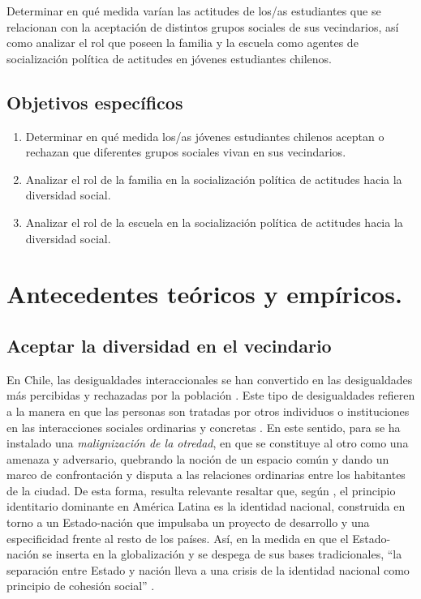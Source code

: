 \documentclass[12pt,twoside]{templates/facsothesis}
\begin{document}
Determinar en qué medida varían las actitudes de los/as estudiantes que se relacionan con la aceptación de distintos grupos sociales de sus vecindarios, así como analizar el rol que poseen la familia y la escuela como agentes de socialización política de actitudes en jóvenes estudiantes chilenos.

\hypertarget{objetivos-especuxedficos}{%
\section{Objetivos específicos}\label{objetivos-especuxedficos}}

\begin{enumerate}
\def\labelenumi{\arabic{enumi}.}
\item
  Determinar en qué medida los/as jóvenes estudiantes chilenos aceptan o rechazan que diferentes grupos sociales vivan en sus vecindarios.
\item
  Analizar el rol de la familia en la socialización política de actitudes hacia la diversidad social.
\item
  Analizar el rol de la escuela en la socialización política de actitudes hacia la diversidad social.
\end{enumerate}

\hypertarget{antecedentes-teuxf3ricos-y-empuxedricos.}{%
\chapter{Antecedentes teóricos y empíricos.}\label{antecedentes-teuxf3ricos-y-empuxedricos.}}

\hypertarget{aceptar-la-diversidad-en-el-vecindario}{%
\section{Aceptar la diversidad en el vecindario}\label{aceptar-la-diversidad-en-el-vecindario}}

En Chile, las desigualdades interaccionales se han convertido en las desigualdades más percibidas y rechazadas por la población \citep{araujo_igualdad_2013}. Este tipo de desigualdades refieren a la manera en que las personas son tratadas por otros individuos o instituciones en las interacciones sociales ordinarias y concretas \citep{araujo_percepcion_2019}. En este sentido, para \citet{araujo_percepcion_2019} se ha instalado una \emph{malignización de la otredad}, en que se constituye al otro como una amenaza y adversario, quebrando la noción de un espacio común y dando un marco de confrontación y disputa a las relaciones ordinarias entre los habitantes de la ciudad. De esta forma, resulta relevante resaltar que, según \citet{castells_globalizacion_2005}, el principio identitario dominante en América Latina es la identidad nacional, construida en torno a un Estado-nación que impulsaba un proyecto de desarrollo y una especificidad frente al resto de los países. Así, en la medida en que el Estado-nación se inserta en la globalización y se despega de sus bases tradicionales, ``la separación entre Estado y nación lleva a una crisis de la identidad nacional como principio de cohesión social'' \citep[p.~40]{castells_globalizacion_2005}.
\end{document}

